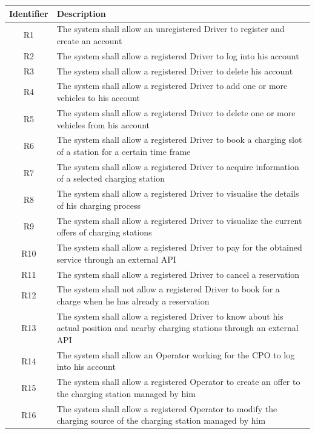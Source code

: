 \documentclass[../main.tex]{subfiles}
\begin{document}
\begin{center}
\begin{longtable}{| c | p{12cm} | } 
\hline
\textbf{Identifier} & \textbf{Description} \\
\hline
R1 & The system shall allow an unregistered Driver to register and create an account \\ 
\hline
R2 & The system shall allow a registered Driver to log into his account\\
\hline
R3 & The system shall allow a registered Driver to delete his account\\
\hline
R4 & The system shall allow a registered Driver to add one or more vehicles to his account\\
\hline
R5 & The system shall allow a registered Driver to delete one or more vehicles from his account\\
\hline
R6 & The system shall allow a registered Driver to book a charging slot of a station for a certain time frame\\
\hline
R7 & The system shall allow a registered Driver to acquire information of a selected charging station\\
\hline
R8 & The system shall allow a registered Driver to visualise the details of his charging process \\
\hline
R9 & The system shall allow a registered Driver to visualize the current offers of charging stations\\
\hline
R10 & The system shall allow a registered Driver to pay for the obtained service through an external API\\
\hline
R11 & The system shall allow a registered Driver to cancel a reservation \\
\hline
R12 & The system shall not allow a registered Driver to book for a charge when he has already a reservation\\
\hline
R13 & The system shall allow a registered Driver to know about his actual position and nearby charging stations through an external API\\
\hline
R14 & The system shall allow an Operator working for the CPO to log into his account
\\
\hline
R15 & The system shall allow a registered Operator to create an offer to the charging station managed by him
\\
\hline
R16 & The system shall allow a registered Operator to modify the charging source of the charging station managed by him

\end{longtable}
\end{center}
\end{document}
